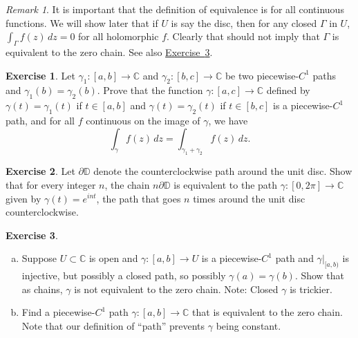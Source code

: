 \documentclass[12pt,openany]{book}
\newcommand{\C}{{\mathbb{C}}}
\newcommand{\D}{{\mathbb{D}}}
\newcommand{\myquote}[1]{``#1''}
\theoremstyle{plain}
\theoremstyle{remark}
\newtheorem{remark}[thm]{Remark}
\theoremstyle{definition}
\newenvironment{exbox}{%
    \def\FrameCommand{\vrule width 1pt \relax\hspace{10pt}}%
    \MakeFramed{\advance\hsize-\width\FrameRestore}%
}{%
    \endMakeFramed
}
\newenvironment{exparts}{%
    \leavevmode\begin{enumerate}[a),noitemsep,topsep=0pt,parsep=0pt,partopsep=0pt]
}{%
    \end{enumerate}
}
\theoremstyle{exercise}
\newtheorem{exercise}{Exercise}[section]
\theoremstyle{example}
\newcommand{\exerciseref}[1]{\hyperref[#1]{Exercise~\ref*{#1}}}
\begin{document}
\begin{remark}
It is important that the definition of equivalence is for all continuous
functions.  We will show later that if $U$ is say the disc, then for
any closed $\Gamma$ in $U$, $\int_\Gamma f(z) \, dz = 0$ for all holomorphic $f$.
Clearly that should not imply that $\Gamma$ is equivalent to the zero
chain.
See also \exerciseref{exercise:nonconstantnonzerochain}.
\end{remark}

\begin{exbox}
\begin{exercise}%
\label{exercise:pathsum}
Let $\gamma_1 \colon [a,b] \to \C$ and $\gamma_2 \colon [b,c] \to \C$
be two piecewise-$C^1$ paths and $\gamma_1(b)=\gamma_2(b)$.
Prove that the function $\gamma \colon [a,c] \to
\C$ defined by $\gamma(t) = \gamma_1(t)$ if $t \in [a,b]$ and $\gamma(t)
= \gamma_2(t)$ if $t \in [b,c]$ is a piecewise-$C^1$ path, and
for all $f$ continuous on the image of $\gamma$, we have
\begin{equation*}
\int_{\gamma} f(z)\,dz = \int_{\gamma_1 + \gamma_2} f(z) \, dz .
\end{equation*}
\end{exercise}

\begin{exercise}
Let $\partial \D$ denote the counterclockwise path around the unit disc.
Show that for every integer $n$, the chain $n \partial \D$ is equivalent to
the path $\gamma \colon [0,2\pi] \to \C$ given by $\gamma(t) = e^{int}$,
the path that goes $n$ times around the unit disc counterclockwise.
\end{exercise}

\begin{exercise} \label{exercise:nonconstantnonzerochain}
\begin{exparts}
\item
Suppose $U \subset \C$ is open and
$\gamma \colon [a,b] \to U$
is a piecewise-$C^1$
path and $\gamma|_{[a,b)}$ is injective, but possibly a closed path,
so possibly $\gamma(a)=\gamma(b)$.  Show that as chains, $\gamma$ is not equivalent to the zero chain.
Note: Closed $\gamma$ is trickier.
\item
Find a piecewise-$C^1$ path $\gamma \colon [a,b] \to \C$
that is equivalent to the zero chain.  Note that our definition of
\myquote{path}
prevents $\gamma$ being constant.
\end{exparts}
\end{exercise}
\end{exbox}
\end{document}
